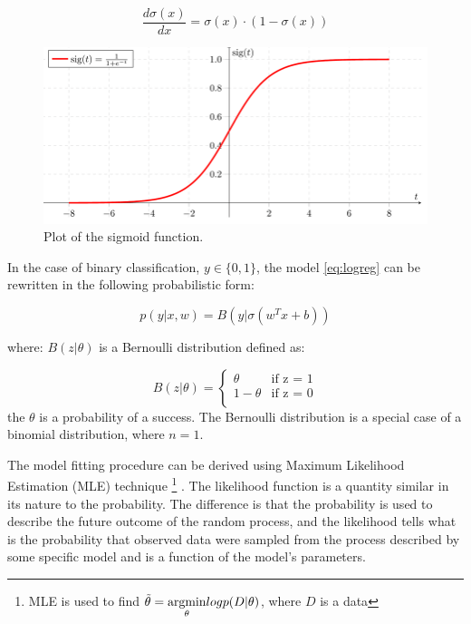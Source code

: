 \begin{equation}
    \frac{d\sigma(x)}{dx} = \sigma(x)\cdot(1-\sigma(x))
\end{equation}


\begin{figure}[h]
\centering
\includegraphics[width=\textwidth]{figures/sigmoid.png}
\caption{Plot of the sigmoid function.
\label{fig:sigmoid}}
\end{figure}

In the case of binary classification, $y \in \{0,1\}$, the model \ref{eq:logreg} can be rewritten in the following probabilistic form:

\begin{equation}
p(y|x,w) = B(y|\sigma(w^{T}x + b))
\end{equation}

where: $B(z|\theta)$ is a Bernoulli  distribution defined as:

\begin{equation}
    B(z|\theta) =  \left\{ \begin{array}{ll}
\theta & \textrm{if z = 1}\\
1-\theta & \textrm{if z = 0}\\
\end{array} \right.
\end{equation}
the $\theta$ is a probability of a success. The Bernoulli distribution is a special case of a binomial distribution, where $n=1$. 

The model fitting procedure
can be derived using Maximum Likelihood Estimation (MLE) technique \footnote{ MLE is used to find $\Tilde{\theta} = \underset{\theta}{\mathrm{argmin}} log p(D|\theta)$, where $D$ is a data} \cite{bishop}. The likelihood function is a quantity similar in its nature to the probability. The difference is that the probability is used to describe the future outcome of the random process, and the likelihood tells what is the probability that observed data were sampled from the process described by some specific model and is a function of the model's parameters. 

